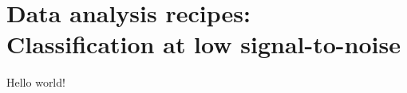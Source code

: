 \documentclass[12pt, letterpaper]{article}
\begin{document}
\section*{Data analysis recipes:\\
          Classification at low signal-to-noise}

Hello world!
\end{document}
